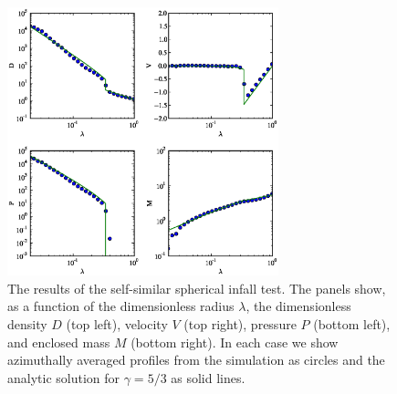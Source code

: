 \begin{figure}
\begin{center}
\includegraphics[width=0.7\textwidth]{figures/SphericalInfall.eps}
\caption{The results of the self-similar spherical infall test.  The
panels show, as a function of the dimensionless radius $\lambda$, the
dimensionless density $D$ (top left), velocity $V$ (top right),
pressure $P$ (bottom left), and enclosed mass $M$ (bottom right).  In
each case we show azimuthally averaged profiles from the simulation as
circles and the analytic solution for $\gamma = 5/3$ as solid lines.}
\label{fig.sphericalinfall}
\end{center}
\end{figure}

